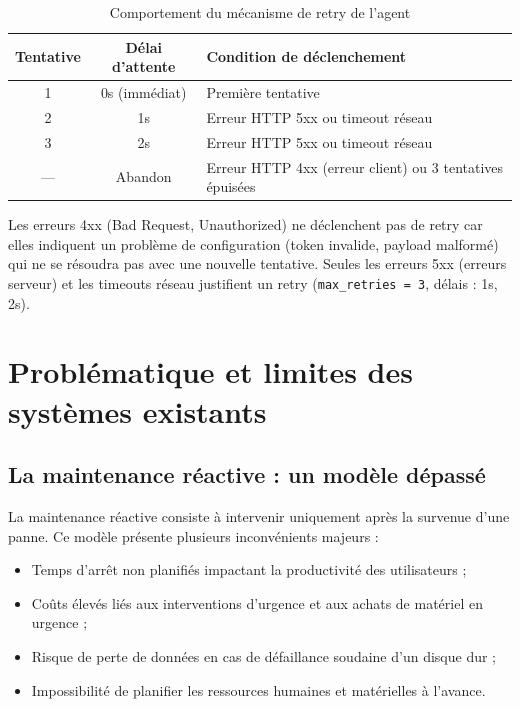 \begin{table}[H]
\centering
\caption{Comportement du mécanisme de retry de l'agent}
\begin{tabular}{|c|c|l|}
\hline
\rowcolor{lightblue}
\textbf{Tentative} & \textbf{Délai d'attente} & \textbf{Condition de déclenchement} \\
\hline
1 & 0s (immédiat) & Première tentative \\
\hline
2 & 1s & Erreur HTTP 5xx ou timeout réseau \\
\hline
3 & 2s & Erreur HTTP 5xx ou timeout réseau \\
\hline
— & Abandon & Erreur HTTP 4xx (erreur client) ou 3 tentatives épuisées \\
\hline
\end{tabular}
\end{table}

Les erreurs 4xx (Bad Request, Unauthorized) ne déclenchent pas de retry car elles indiquent
un problème de configuration (token invalide, payload malformé) qui ne se résoudra pas avec
une nouvelle tentative. Seules les erreurs 5xx (erreurs serveur) et les timeouts réseau
justifient un retry (\texttt{max\_retries = 3}, délais : 1s, 2s).

\section{Problématique et limites des systèmes existants}

\subsection{La maintenance réactive : un modèle dépassé}

La maintenance réactive consiste à intervenir uniquement après la survenue d'une panne.
Ce modèle présente plusieurs inconvénients majeurs :

\begin{itemize}
  \item Temps d'arrêt non planifiés impactant la productivité des utilisateurs ;
  \item Coûts élevés liés aux interventions d'urgence et aux achats de matériel en urgence ;
  \item Risque de perte de données en cas de défaillance soudaine d'un disque dur ;
  \item Impossibilité de planifier les ressources humaines et matérielles à l'avance.
\end{itemize}

